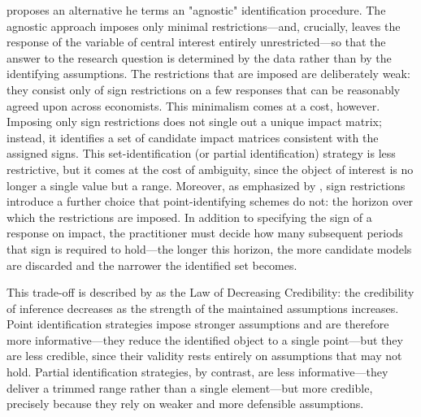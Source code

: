 \documentclass[12pt, a4paper]{article}
\begin{document}
\citet{uhligWhatAreEffects2005} proposes an alternative he terms an "agnostic" identification procedure. The agnostic approach imposes only minimal restrictions---and, crucially, leaves the response of the variable of central interest entirely unrestricted---so that the answer to the research question is determined by the data rather than by the identifying assumptions. The restrictions that are imposed are deliberately weak: they consist only of sign restrictions on a few responses that can be reasonably agreed upon across economists. This minimalism comes at a cost, however. Imposing only sign restrictions does not single out a unique impact matrix; instead, it identifies a set of candidate impact matrices consistent with the assigned signs. This set-identification (or partial identification) strategy is less restrictive, but it comes at the cost of ambiguity, since the object of interest is no longer a single value but a range. Moreover, as emphasized by \citet{uhligWhatAreEffects2005}, sign restrictions introduce a further choice that point-identifying schemes do not: the horizon over which the restrictions are imposed. In addition to specifying the sign of a response on impact, the practitioner must decide how many subsequent periods that sign is required to hold---the longer this horizon, the more candidate models are discarded and the narrower the identified set becomes.

This trade-off is described by \citet{PartialIdentificationProbability2003a} as the Law of Decreasing Credibility: the credibility of inference decreases as the strength of the maintained assumptions increases. Point identification strategies impose stronger assumptions and are therefore more informative—they reduce the identified object to a single point—but they are less credible, since their validity rests entirely on assumptions that may not hold. Partial identification strategies, by contrast, are less informative—they deliver a trimmed range rather than a single element—but more credible, precisely because they rely on weaker and more defensible assumptions. 
\end{document}
